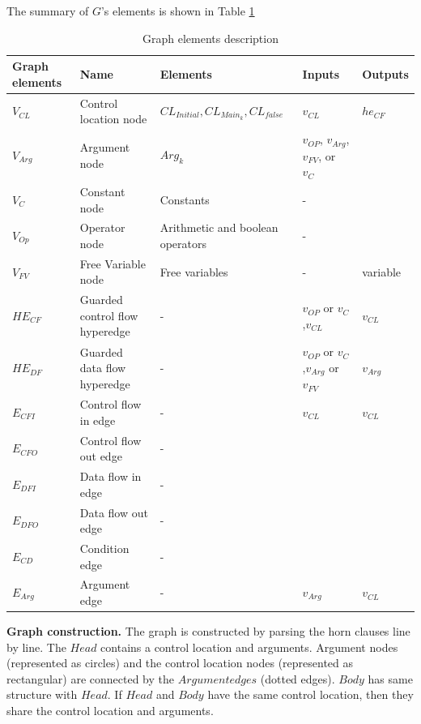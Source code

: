 \documentclass{article}
\begin{document}
The summary of $G$'s elements is shown in Table \ref{GraphDescription}
\begin{table}\caption{Graph elements description} \label{GraphDescription}
\begin{center}
\begin{tabular}{lllll}
\hline
Graph elements & Name & Elements & Inputs & Outputs \\
\hline
$V_{CL}$  & Control location node            & $CL_{Initial},CL_{Main_{k}},CL_{false}$ & $v_{CL}$ & $he_{CF}$\\
$V_{Arg}$ & Argument node                    & $Arg_{k}$                               &  $v_{OP}$, $v_{Arg}$, $v_{FV}$, or $v_{C}$ &\\
$V_{C}$   & Constant node                    & Constants                               & - &\\
$V_{Op}$  & Operator node                    & Arithmetic and boolean operators        & - &\\
$V_{FV}$  & Free Variable node               & Free variables                          & -  & variable\\
$HE_{CF}$ & Guarded control flow hyperedge   & -                                       & $v_{OP}$ or $v_{C}$,$v_{CL}$ & $v_{CL}$\\
$HE_{DF}$ & Guarded data flow hyperedge      & -                                       & $v_{OP}$ or $v_{C}$,$v_{Arg}$ or $v_{FV}$ & $v_{Arg}$\\
$E_{CFI}$ & Control flow in edge             & -                                       & $v_{CL}$                                  & $v_{CL}$\\
$E_{CFO}$ & Control flow out edge            & - &&\\
$E_{DFI}$ & Data flow in edge                & - &&\\
$E_{DFO}$ & Data flow out edge               & - &&\\
$E_{CD}$ &  Condition edge                   & - &&\\
$E_{Arg}$ & Argument edge                    & -                                        &$v_{Arg}$ & $v_{CL}$\\
\hline
\end{tabular}
\end{center}
\end{table}



\textbf{Graph construction.} The graph is constructed by parsing the horn clauses line by line. The $Head$ contains a control location and arguments. Argument nodes (represented as circles) and the control location nodes (represented as rectangular) are connected by the $Argument edges$ (dotted edges).
$Body$ has same structure with $Head$. 
If $Head$ and $Body$ have the same control location, then they share the control location and arguments. 
 
\end{document}
